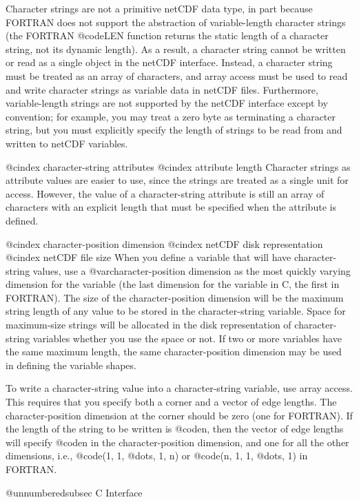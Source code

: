Character strings are not a primitive netCDF data type, in part because
FORTRAN does not support the abstraction of variable-length character
strings (the FORTRAN @code{LEN} function returns the static length of a
character string, not its dynamic length).  As a result, a character
string cannot be written or read as a single object in the netCDF
interface.  Instead, a character string must be treated as an array of
characters, and array access must be used to read and write
character strings as variable data in netCDF files.  Furthermore,
variable-length strings are not supported by the netCDF interface except
by convention; for example, you may treat a zero byte as
terminating a character string, but you must explicitly specify the
length of strings to be read from and written to netCDF variables.

@cindex character-string attributes
@cindex attribute length
Character strings as attribute values are easier to use, since the
strings are treated as a single unit for access.  However, the value of a
character-string attribute is still an array of characters with an
explicit length that must be specified when the attribute is defined.

@cindex character-position dimension
@cindex netCDF disk representation
@cindex netCDF file size
When you define a variable that will have character-string values, use a
@var{character-position dimension} as the most quickly varying dimension
for the variable (the last dimension for the variable in C, the first in
FORTRAN).  The size of the character-position dimension will be the
maximum string length of any value to be stored in the character-string
variable.  Space for maximum-size strings will be allocated in the disk
representation of character-string variables whether you use the space
or not.  If two or more variables have the same maximum length, the same
character-position dimension may be used in defining the variable shapes.

To write a character-string value into a character-string variable, use
array access.  This requires that you specify both a corner and a
vector of edge lengths.  The character-position dimension at the corner
should be zero (one for FORTRAN).  If the length of the string to be
written is @code{n}, then the vector of edge lengths will specify
@code{n} in the character-position dimension, and one for all the other
dimensions, i.e., @code{(1, 1, @dots{}, 1, n)} or @code{(n, 1, 1, @dots{},
1)} in FORTRAN.

@unnumberedsubsec C Interface

